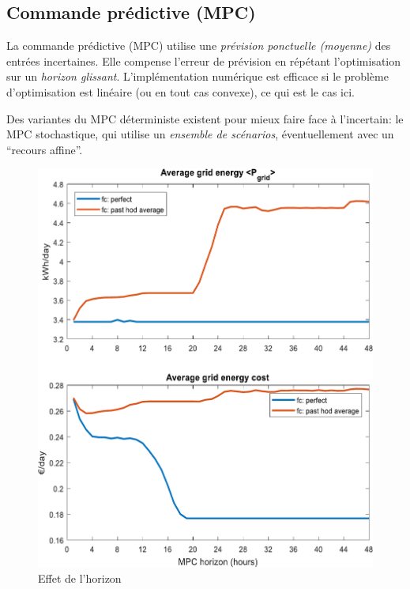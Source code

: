 \documentclass[a4paper,10pt,twocolumn]{article}
\begin{document}
\subsection{Commande prédictive (MPC)}
La commande prédictive (MPC) utilise une \emph{prévision ponctuelle (moyenne)} des entrées incertaines.
Elle compense l'erreur de prévision en répétant l'optimisation sur un \emph{horizon glissant}.
L'implémentation numérique est efficace si le problème d'optimisation est linéaire (ou en tout cas convexe),
ce qui est le cas ici.

Des variantes du MPC déterministe existent pour mieux faire face à l'incertain: le MPC stochastique,
qui utilise un \emph{ensemble de scénarios}, éventuellement avec un ``recours affine''.

\begin{figure}[!ht]
        \begin{center}
                \includegraphics[width=1\columnwidth]{figures/Average_grid_Energy_cost.pdf}
        \end{center}

        \caption{Effet de l'horizon
        }
        \label{fig:mpc_horiz}
\end{figure}
\end{document}
